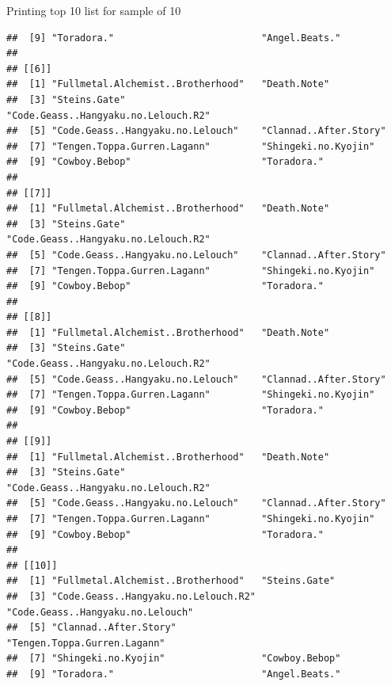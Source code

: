 \documentclass[
  ignorenonframetext,
]{beamer}
\begin{document}
\begin{frame}[fragile]{Printing top 10 list for sample of 10}
\begin{verbatim}
##  [9] "Toradora."                          "Angel.Beats."                      
## 
## [[6]]
##  [1] "Fullmetal.Alchemist..Brotherhood"   "Death.Note"                        
##  [3] "Steins.Gate"                        "Code.Geass..Hangyaku.no.Lelouch.R2"
##  [5] "Code.Geass..Hangyaku.no.Lelouch"    "Clannad..After.Story"              
##  [7] "Tengen.Toppa.Gurren.Lagann"         "Shingeki.no.Kyojin"                
##  [9] "Cowboy.Bebop"                       "Toradora."                         
## 
## [[7]]
##  [1] "Fullmetal.Alchemist..Brotherhood"   "Death.Note"                        
##  [3] "Steins.Gate"                        "Code.Geass..Hangyaku.no.Lelouch.R2"
##  [5] "Code.Geass..Hangyaku.no.Lelouch"    "Clannad..After.Story"              
##  [7] "Tengen.Toppa.Gurren.Lagann"         "Shingeki.no.Kyojin"                
##  [9] "Cowboy.Bebop"                       "Toradora."                         
## 
## [[8]]
##  [1] "Fullmetal.Alchemist..Brotherhood"   "Death.Note"                        
##  [3] "Steins.Gate"                        "Code.Geass..Hangyaku.no.Lelouch.R2"
##  [5] "Code.Geass..Hangyaku.no.Lelouch"    "Clannad..After.Story"              
##  [7] "Tengen.Toppa.Gurren.Lagann"         "Shingeki.no.Kyojin"                
##  [9] "Cowboy.Bebop"                       "Toradora."                         
## 
## [[9]]
##  [1] "Fullmetal.Alchemist..Brotherhood"   "Death.Note"                        
##  [3] "Steins.Gate"                        "Code.Geass..Hangyaku.no.Lelouch.R2"
##  [5] "Code.Geass..Hangyaku.no.Lelouch"    "Clannad..After.Story"              
##  [7] "Tengen.Toppa.Gurren.Lagann"         "Shingeki.no.Kyojin"                
##  [9] "Cowboy.Bebop"                       "Toradora."                         
## 
## [[10]]
##  [1] "Fullmetal.Alchemist..Brotherhood"   "Steins.Gate"                       
##  [3] "Code.Geass..Hangyaku.no.Lelouch.R2" "Code.Geass..Hangyaku.no.Lelouch"   
##  [5] "Clannad..After.Story"               "Tengen.Toppa.Gurren.Lagann"        
##  [7] "Shingeki.no.Kyojin"                 "Cowboy.Bebop"                      
##  [9] "Toradora."                          "Angel.Beats."
\end{verbatim}

\end{frame}
\end{document}
